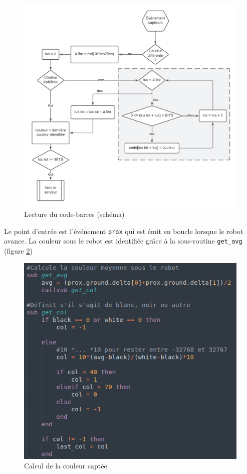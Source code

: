 \begin{figure}[H]
  \centering
  \includegraphics[width=0.9\linewidth]{code/barcode_figure}
  \caption{Lecture du code-barres (schéma)}
  \label{fig:barcode_figure}
\end{figure}

Le point d'entrée est l'événement \texttt{prox} qui est émit en boucle lorsque le robot avance. La couleur sous le robot est identifiée grâce à la sous-routine \texttt{get\_avg} (figure \ref{fig:client_get_avg})

\begin{figure}[H]
  \centering
  \includegraphics[width=0.7\linewidth]{code/client_get_avg}
  \caption{Calcul de la couleur captée}
  \label{fig:client_get_avg}
\end{figure}

